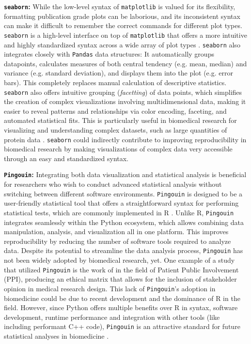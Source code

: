 \textbf{\texttt{seaborn}:} While the low-level syntax of \texttt{matplotlib} is
valued for its flexibility, formatting publication grade plots can be laborious,
and its inconsistent syntax can make it difficult to remember the correct
commands for different plot types. \texttt{seaborn} is a high-level interface on
top of \texttt{matplotlib} that offers a more intuitive and highly standardized
syntax across a wide array of plot types
\cite{waskomSeabornStatisticalData2021}. \texttt{seaborn} also integrates
closely with \texttt{Pandas} data structures: It automatically groups
datapoints, calculates measures of both central tendency (e.g. mean, median) and
variance (e.g. standard deviation), and displays them into the plot (e.g. error
bars). This completely replaces manual calculation of descriptive statistics.
\texttt{seaborn} also offers intuitive grouping (\textit{facetting}) of data
points, which simplifies the creation of complex visualizations involving
multidimensional data, making it easier to reveal patterns and relationships via
color encoding, faceting, and automated statistical fits. This is particularly
useful in biomedical research for visualizing and understanding complex
datasets, such as large quantities of protein data
\cite{krzywinskiMultidimensionalData2013,weissVisualizingProteinBig2022}.
\texttt{seaborn} could indirectly contribute to improving reproducibility in
biomedical research by making visualizations of complex data very accessible
through an easy and standardized syntax.



\textbf{\texttt{Pingouin}:} Integrating both data visualization and statistical
analysis is beneficial for researchers who wish to conduct advanced statistical
analysis without switching between different software environments.
\texttt{Pingouin} is designed to be a user-friendly statistical tool that offers
a straightforward syntax for performing statistical tests, which are commonly
implemented in R \cite{vallatPingouinStatisticsPython2018}. Unlike R,
\texttt{Pingouin} integrates seamlessly within the Python ecosystem, which
allows combining data manipulation, analysis, and visualization all in one
platform. This improves reproducibility by reducing the number of software tools
required to analyze data. Despite its potential to streamline the data analysis
process, \texttt{Pingouin} has not been widely adopted by biomedical research,
yet. One example of a study that utilized \texttt{Pingouin} is the work of
\citet{kellyEthicalMatrixMethod2023} in the field of Patient Public Involvement
(PPI), producing an ethical matrix that allows for the inclusion of stakeholder
opinion in medical research design. This lack of \texttt{Pingouin}'s adoption in
biomedicine could be due to recent development and the dominance of R in the
field. However, since Python offers multiple benefits over R in syntax, software
development, runtime performance and integration with other tools (like
including performant C++ code), \texttt{Pingouin} is an attractive standard for
future statistical analyses in biomedicine
\cite{gorelickHighPerformancePython2020}.

